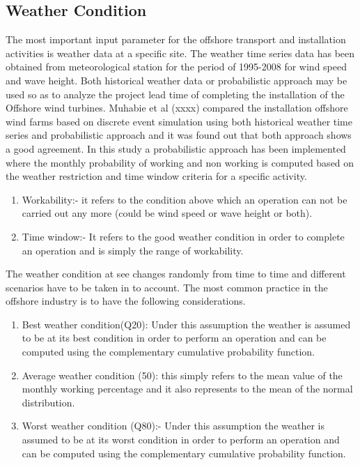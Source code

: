 \subsection{Weather Condition}

The most important input parameter for the offshore transport and installation activities is weather data at a specific site. The weather time series data has been obtained from meteorological station for the period of 1995-2008 for wind speed and wave height. Both historical weather data or probabilistic approach may be used so as to  analyze the project lead time of completing the installation of the Offshore wind turbines. Muhabie et al (xxxx) compared the installation offshore wind farms based on discrete event simulation using both historical weather time series and probabilistic approach  and it was found out that both approach shows a good agreement. In this study a probabilistic approach has been implemented where the monthly probability of working and non working is computed based on the weather restriction and time window criteria for a specific activity. 
\begin{enumerate}
\item
Workability:- it refers to the condition above which an operation can not be carried out any more (could be wind speed or wave height or both).
\item Time window:- It refers to the good weather condition in order to complete an operation and is simply the range of workability.
\end{enumerate}
The weather condition at see changes randomly from time to time and different scenarios have to be taken in to account. The most common practice in the offshore industry is to have the following considerations.

\begin{enumerate}[i]
\item
Best weather condition(Q20): Under this assumption the weather is assumed to be at its best condition in order to perform an operation and can be computed using the complementary cumulative probability function. 
\item
Average weather condition (50): this simply refers to the mean value of the monthly working percentage and it also represents to the mean of the normal distribution.
\item Worst weather condition (Q80):- Under this assumption the weather is assumed to be at its worst condition in order to perform an operation and can be computed using the complementary cumulative probability function. 
\end{enumerate}

